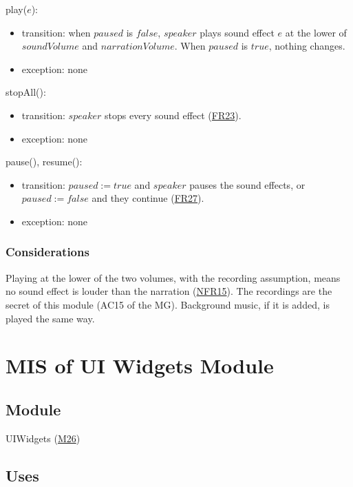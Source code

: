 \documentclass[10pt, titlepage]{article}
\newcommand{\srsurl}{https://team-hindsight.github.io/ophthamology-game/SRS/SRS.pdf}
\newcommand{\srsitemref}[2]{\href{\srsurl\#nameddest=#1}{#2}}
\newcommand{\misref}[2]{\hyperref[mis:#1]{M#2}}
\newcommand{\T}[1]{\mathit{#1}}          %
\newcommand{\true}{\mathit{true}}
\newcommand{\false}{\mathit{false}}
\begin{document}
\noindent play($e$):
\begin{itemize}
\item transition: when $\T{paused}$ is $\false$, $\T{speaker}$ plays sound
  effect $e$ at the lower of $\T{soundVolume}$ and $\T{narrationVolume}$. When
  $\T{paused}$ is $\true$, nothing changes.
\item exception: none
\end{itemize}

\noindent stopAll():
\begin{itemize}
\item transition: $\T{speaker}$ stops every sound effect
  (\srsitemref{FR_StopOnExit}{FR23}).
\item exception: none
\end{itemize}

\noindent pause(), resume():
\begin{itemize}
\item transition: $\T{paused} := \true$ and $\T{speaker}$ pauses the sound
  effects, or $\T{paused} := \false$ and they continue
  (\srsitemref{FR_Suspend}{FR27}).
\item exception: none
\end{itemize}

\subsubsection{Considerations}

Playing at the lower of the two volumes, with the recording assumption, means
no sound effect is louder than the narration
(\srsitemref{NFR_AudioSafety}{NFR15}). The recordings are the secret of this
module (AC15 of the MG). Background music, if it is added, is played the same
way.

\newpage
\section{MIS of UI Widgets Module} \label{mis:Widgets}

\subsection{Module}

UIWidgets (\misref{Widgets}{26})

\subsection{Uses}
\end{document}
